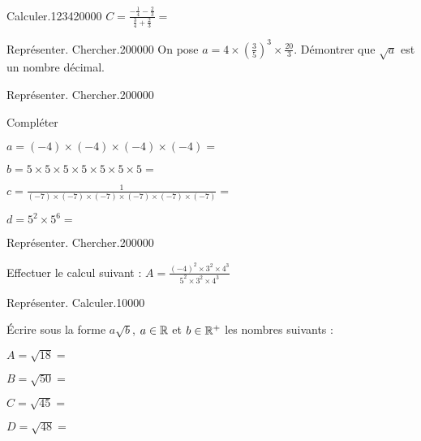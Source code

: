 \begin{pageParcoursu}
\begin{ExoCu}{Calculer.}{1234}{2}{0}{0}{0}{0}
$C = \frac{-\frac{1}{4} -\frac{2}{3}}{\frac{3}{4}+\frac{2}{3}}=$ 
\end{ExoCu}


\begin{ExoCu}{Représenter. Chercher.}{2}{0}{0}{0}{0}{0}
On pose $a=4\times \left(\frac{3}{5}\right)^3 \times \frac{20}{3}$. Démontrer que $\sqrt{a}$ est un nombre décimal.
\end{ExoCu}


\begin{ExoCu}{Représenter. Chercher.}{2}{0}{0}{0}{0}{0}

Compléter \vspace{0.4cm}

\begin{minipage}{0.48\linewidth}
$a= (-4) \times (-4)\times (-4) \times (-4)  =$  
 
$b= 5 \times 5\times 5 \times 5 \times 5\times 5 \times 5  =$  
\end{minipage}
\vrule
\begin{minipage}{0.48\linewidth}
$c= \frac{1}{(-7) \times (-7)\times (-7) \times (-7)\times (-7) \times (-7)}  =$  
 
$d= 5^2 \times 5^6  =$  
\end{minipage}
\end{ExoCu}



\begin{ExoCu}{Représenter. Chercher.}{2}{0}{0}{0}{0}{0}

Effectuer le calcul suivant : $A= \frac{(-4)^2\times 3^2\times 4^3 }{5^2\times 3^2\times 4^3} $  

\end{ExoCu}

\begin{ExoCuN}{Représenter. Calculer.}{1}{0}{0}{0}{0}

Écrire sous la forme $a\sqrt{b}$, $a\in\mathbb R$ et $b \in \mathbb R^+$ les nombres suivants : \vspace{0.4cm}

\begin{minipage}{0.5\linewidth}
$A = \sqrt{18}=$  

$B=\sqrt{50}=$  

\end{minipage}
\vrule
\begin{minipage}{0.5\linewidth}
$C=\sqrt{45}=$    

$D=\sqrt{48}=$  
\end{minipage}
 
\end{ExoCuN}


 


\end{pageParcoursu} %
 
